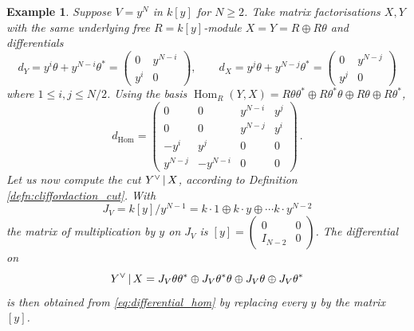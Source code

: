 \documentclass[english,letter paper,12pt,leqno]{article}
\theoremstyle{example}
\newtheorem{example}[theorem]{Example}
\numberwithin{equation}{section}
\def\Hom{\operatorname{Hom}}
\def\be{\begin{equation}}
\def\ee{\end{equation}}
\begin{document}
\begin{example} Suppose $V = y^N$ in $k[y]$ for $N \ge 2$. Take matrix factorisations $X,Y$ with the same underlying free $R = k[y]$-module $X = Y = R \oplus R \theta$ and differentials
\[
d_Y = y^i \theta + y^{N-i} \theta^* = \begin{pmatrix} 0 & y^{N-i} \\ y^i & 0 \end{pmatrix}, \qquad d_X = y^j \theta + y^{N-j} \theta^* = \begin{pmatrix} 0 & y^{N-j}\\ y^j & 0 \end{pmatrix}
\]
where $1 \le i,j \le N/2$. Using the basis $\Hom_R(Y,X) = R \theta \theta^* \oplus R \theta^* \theta \oplus R\theta \oplus R \theta^*$,
\begin{equation}\label{eq:differential_hom}
d_{\Hom} = \begin{pmatrix} 0 & 0 & y^{N-i} & y^j \\ 
0 & 0 & y^{N-j} & y^i \\
-y^i & y^j & 0 & 0 \\
y^{N-j} & -y^{N-i} & 0 & 0 \end{pmatrix}\,.
\end{equation}
Let us now compute the cut $Y^{\vee} \,|\, X$, according to Definition \ref{defn:cliffordaction_cut}. With
\be\label{eq:examplecut_basis2}
J_V = k[y]/y^{N-1} = k \cdot 1 \oplus k \cdot y \oplus \cdots k \cdot y^{N-2}
\ee
the matrix of multiplication by $y$ on $J_V$ is $[y] = \begin{pmatrix} 0 & 0\\ I_{N-2} & 0 \end{pmatrix}$. The differential on
\be\label{eq:examplecut_basis}
Y^{\vee} \l X = J_V \theta \theta^* \oplus J_V \theta^* \theta \oplus J_V\theta \oplus J_V \theta^*
\ee
is then obtained from \eqref{eq:differential_hom} by replacing every $y$ by the matrix $[y]$.


\end{example}
\end{document}
